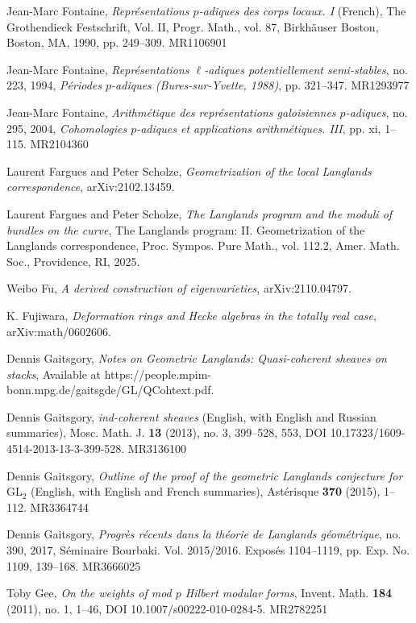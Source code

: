 \item[{[Fon90]}] Jean-Marc Fontaine, \emph{Repr\'esentations $p$-adiques des corps locaux. I} (French), The Grothendieck Festschrift, Vol. II, Progr. Math., vol. 87, Birkh\"auser Boston, Boston, MA, 1990, pp. 249--309. MR1106901
\item[{[Fon94]}] Jean-Marc Fontaine, \emph{Repr\'esentations $\ell$-adiques potentiellement semi-stables}, no. 223, 1994, \emph{P\'eriodes $p$-adiques (Bures-sur-Yvette, 1988)}, pp. 321--347. MR1293977
\item[{[Fon04]}] Jean-Marc Fontaine, \emph{Arithm\'etique des repr\'esentations galoisiennes $p$-adiques}, no. 295, 2004, \emph{Cohomologies $p$-adiques et applications arithm\'etiques. III}, pp. xi, 1--115. MR2104360
\item[{[FS24]}] Laurent Fargues and Peter Scholze, \emph{Geometrization of the local Langlands correspondence}, arXiv:2102.13459.
\item[{[FS25]}] Laurent Fargues and Peter Scholze, \emph{The Langlands program and the moduli of bundles on the curve}, The Langlands program: II. Geometrization of the Langlands correspondence, Proc. Sympos. Pure Math., vol. 112.2, Amer. Math. Soc., Providence, RI, 2025.
\item[{[Fu21]}] Weibo Fu, \emph{A derived construction of eigenvarieties}, arXiv:2110.04797.
\item[{[Fuj06]}] K. Fujiwara, \emph{Deformation rings and Hecke algebras in the totally real case}, arXiv:math/0602606.
\item[{[Gai]}] Dennis Gaitsgory, \emph{Notes on Geometric Langlands: Quasi-coherent sheaves on stacks}, Available at https://people.mpim-bonn.mpg.de/gaitsgde/GL/QCohtext.pdf.
\item[{[Gai12]}] Dennis Gaitsgory, \emph{ind-coherent sheaves} (English, with English and Russian summaries), Mosc. Math. J. \textbf{13} (2013), no. 3, 399--528, 553, DOI 10.17323/1609-4514-2013-13-3-399-528. MR3136100
\item[{[Gai15]}] Dennis Gaitsgory, \emph{Outline of the proof of the geometric Langlands conjecture for $\mathrm{GL}_2$} (English, with English and French summaries), Ast\'erisque \textbf{370} (2015), 1--112. MR3364744
\item[{[Gai17]}] Dennis Gaitsgory, \emph{Progr\`es r\'ecents dans la th\'eorie de Langlands g\'eom\'etrique}, no. 390, 2017, S\'eminaire Bourbaki. Vol. 2015/2016. Expos\'es 1104--1119, pp. Exp. No. 1109, 139--168. MR3666025
\item[{[Gee11]}] Toby Gee, \emph{On the weights of mod $p$ Hilbert modular forms}, Invent. Math. \textbf{184} (2011), no. 1, 1--46, DOI 10.1007/s00222-010-0284-5. MR2782251
